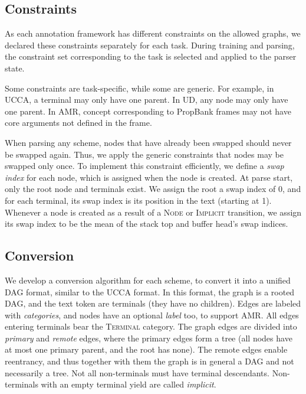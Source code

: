 \documentclass[11pt,a4paper]{article}
\begin{document}
\subsection{Constraints}

As each annotation framework has different constraints on the allowed graphs,
we declared these constraints separately for each task.
During training and parsing, the constraint set corresponding to the task is
selected and applied to the parser state.

Some constraints are task-specific, while some are generic.
For example, in UCCA, a terminal may only have one parent.
In UD, any node may only have one parent.
In AMR, concept corresponding to PropBank frames may not have core arguments not defined in the frame.

When parsing any scheme, nodes that have already been swapped
should never be swapped again.
Thus, we apply the generic constraints that nodes may be swapped only once.
To implement this constraint efficiently, we define a \textit{swap index}
for each node, which is assigned when the node is created.
At parse start, only the root node and terminals exist.
We assign the root a swap index of 0, and for each terminal, its swap index
is its position in the text (starting at 1).
Whenever a node is created as a result of a \textsc{Node} or \textsc{Implicit}
transition, we assign its swap index to be the mean of the stack top and buffer
head's swap indices.


\subsection{Conversion}\label{sec:conversion}

We develop a conversion algorithm for each scheme,
to convert it into a unified DAG format, similar to the UCCA format.
In this format, the graph is a rooted DAG, and the text token are terminals
(they have no children).
Edges are labeled with \textit{categories}, and
nodes have an optional \textit{label} too, to support AMR.
All edges entering terminals bear the \textsc{Terminal} category.
The graph edges are divided into \textit{primary} and \textit{remote} edges,
where the primary edges form a tree (all nodes have at most one primary parent,
and the root has none).
The remote edges enable reentrancy, and thus together with them the graph
is in general a DAG and not necessarily a tree.
Not all non-terminals must have terminal descendants.
Non-terminals with an empty terminal yield are called \textit{implicit}.
\end{document}
